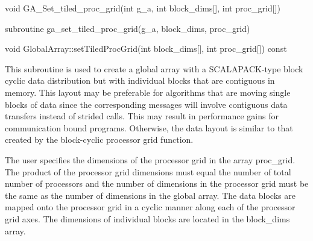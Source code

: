 \documentclass[12pt]{article}
\begin{document}


\begin{capi}
\begin{ccode}
void GA_Set_tiled_proc_grid(int g_a, int block_dims[], int proc_grid[])
\end{ccode}
\begin{funcargs}
\end{funcargs}
\end{capi}

\begin{fapi}
\begin{fcode}
subroutine ga_set_tiled_proc_grid(g_a, block_dims, proc_grid)
\end{fcode}
\begin{funcargs}
\end{funcargs}
\end{fapi}

\begin{cxxapi}
\begin{cxxcode}
void GlobalArray::setTiledProcGrid(int block_dims[], int proc_grid[]) const
\end{cxxcode}
\begin{funcargs}
\end{funcargs}
\end{cxxapi}

\gcoll

\begin{desc}
This subroutine is used to create a global array with a SCALAPACK-type block
cyclic data distribution but with individual blocks that are contiguous in
memory. This layout may be preferable for algorithms that are moving single
blocks of data since the corresponding messages will involve contiguous data
transfers instead of strided calls. This may result in performance gains for
communication bound programs. Otherwise, the data layout is similar to that
created by the block-cyclic processor grid function.

The user specifies the dimensions of the processor
grid in the array proc_grid. The product of the processor grid dimensions must
equal the number of total number of processors and the number of dimensions in
the processor grid must be the same as the number of dimensions in the global
array. The data blocks are mapped onto the processor grid in a cyclic manner
along each of the processor grid axes. The dimensions of individual blocks are
located in the block_dims array.
\end{desc}
\end{document}
